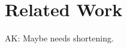 \documentclass[letterpaper, 10 pt, conference]{ieeeconf}  %
\begin{document}


\section{Related Work}
\label{sec:Related Work}

{\color{blue} AK: Maybe needs shortening.}
\end{document}
